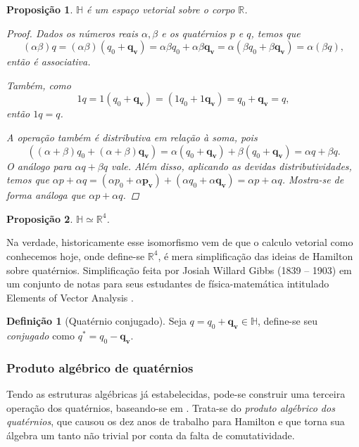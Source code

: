 \documentclass[a4paper,12pt]{report}
\theoremstyle{plain}
\newtheorem{proposicao}{Proposição}[section]
\theoremstyle{definition}
\newtheorem{definicao}{Definição}[section]
\begin{document}
	\begin{proposicao}
		$\mathbb{H}$ é um espaço vetorial sobre o corpo $\mathbb{R}$.
		\begin{proof}
			Dados os números reais $\alpha,\beta$ e os quatérnios $p$ e $q$, temos que $$(\alpha \beta)q=(\alpha \beta)(q_0+\mathbf{q_v})=\alpha \beta q_0+\alpha \beta \mathbf{q_v}=\alpha(\beta q_0+\beta \mathbf{q_v})=\alpha(\beta q),$$ então é associativa.
			
			\noindent Também, como $$1q=1(q_0+\mathbf{q_v})=(1q_0+1\mathbf{q_v})=q_0+\mathbf{q_v}=q,$$ então $1q=q$.
			
			\noindent A operação também é distributiva em relação à soma, pois $$((\alpha + \beta)q_0 + (\alpha + \beta)\mathbf{q_v})=\alpha(q_0+\mathbf{q_v})+\beta(q_0+\mathbf{q_v})=\alpha q+\beta q.$$ O análogo para $\alpha q+\beta q$ vale. Além disso, aplicando as devidas distributividades, temos que $\alpha p+\alpha q=(\alpha p_0+\alpha\mathbf{p_v})+(\alpha q_0+\alpha\mathbf{q_v})=\alpha p+\alpha q$. Mostra-se de forma análoga que $\alpha p+\alpha q$.
		\end{proof}
	\end{proposicao}
	
	\begin{proposicao}
		$\mathbb{H} \simeq \mathbb{R}^4$.
	\end{proposicao}

	Na verdade, historicamente esse isomorfismo vem de que o calculo vetorial como conhecemos hoje, onde define-se $\mathbb{R}^4$, é mera simplificação das ideias de Hamilton sobre quatérnios. Simplificação feita por Josiah Willard Gibbs (1839 – 1903) em um conjunto de notas para seus estudantes de física-matemática intitulado Elements of Vector Analysis \cite{AlgebraAbstrata2BienalSBM}.
	\\
	
	\begin{definicao}[Quatérnio conjugado]
		Seja $q = q_0 + \mathbf{q_v} \in \mathbb{H}$, define-se seu \textit{conjugado} como $q^* = q_0 - \mathbf{q_v}$.
	\end{definicao}
	
	\subsubsection{Produto algébrico de quatérnios}
	Tendo as estruturas algébricas já estabelecidas, pode-se construir uma terceira operação dos quatérnios, baseando-se em \cite{QuaterniosAndRotationsKuipers}. Trata-se do \textit{produto algébrico dos quatérnios}, que causou os dez anos de trabalho para Hamilton e que torna sua álgebra um tanto não trivial por conta da falta de comutatividade.
	\\
	
\end{document}
